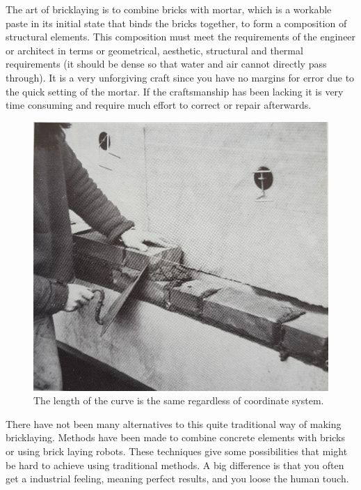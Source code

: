The art of bricklaying is to combine  bricks with mortar, which is a workable paste in its initial state that binds the bricks together, to form a composition of structural elements. This composition must meet the requirements of the engineer or architect in terms or geometrical, aesthetic, structural and thermal requirements (it should be dense so that water and air cannot directly pass through). It is a very unforgiving craft since you have no margins for error due to the quick setting of the mortar. If the craftsmanship has been lacking it is very time consuming and require much effort to correct or repair afterwards. 

\begin{figure}[H]
\centering
\includegraphics[width=0.8\linewidth ]{figure/Theory/brickLay.jpg}
\caption{The length of the curve is the same regardless of coordinate system.}
\end{figure}

There have not been many alternatives to this quite traditional way of making bricklaying. Methods have been made to combine concrete elements with bricks or using brick laying robots. These techniques give some possibilities that might be hard to achieve using traditional methods. A big difference is that you often get a industrial feeling, meaning perfect results, and you loose the human touch.

